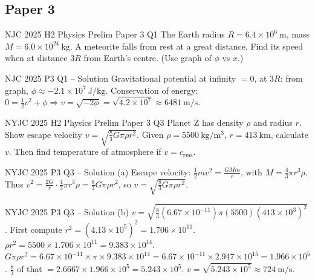 \documentclass[11pt]{beamer}
\begin{document}
\subsection{Paper 3}

\begin{frame}[shrink=15]{NJC 2025 H2 Physics Prelim Paper 3 Q1}
The Earth radius $R = 6.4\times10^6\ \mathrm{m}$, mass $M = 6.0\times10^{24}\ \mathrm{kg}$. A meteorite falls from rest at a great distance. Find its speed when at distance $3R$ from Earth's centre. (Use graph of $\phi$ vs $x$.)
\end{frame}

\begin{frame}{NJC 2025 P3 Q1 – Solution}
Gravitational potential at infinity $=0$, at $3R$: from graph, $\phi \approx -2.1\times10^7\ \mathrm{J/kg}$.
Conservation of energy: $0 = \frac12 v^2 + \phi \Rightarrow v = \sqrt{-2\phi} = \sqrt{4.2\times10^7} \approx 6481\ \mathrm{m/s}$.
\end{frame}

\begin{frame}[shrink=15]{NYJC 2025 H2 Physics Prelim Paper 3 Q3}
Planet Z has density $\rho$ and radius $r$. Show escape velocity $v = \sqrt{\frac83 G\pi\rho r^2}$. Given $\rho = 5500\ \mathrm{kg/m^3}$, $r = 413\ \mathrm{km}$, calculate $v$. Then find temperature of atmosphere if $v = c_{\text{rms}}$.
\end{frame}

\begin{frame}{NYJC 2025 P3 Q3 – Solution (a)}
Escape velocity: $\frac12 m v^2 = \frac{GMm}{r}$, with $M = \frac43 \pi r^3 \rho$.
Thus $v^2 = \frac{2G}{r} \cdot \frac43 \pi r^3 \rho = \frac83 G\pi \rho r^2$, so $v = \sqrt{\frac83 G\pi \rho r^2}$.
\end{frame}

\begin{frame}{NYJC 2025 P3 Q3 – Solution (b)}
$v = \sqrt{\frac83 (6.67\times10^{-11})\pi (5500)(413\times10^3)^2}$.
First compute $r^2 = (4.13\times10^5)^2 = 1.706\times10^{11}$.
$\rho r^2 = 5500\times1.706\times10^{11} = 9.383\times10^{14}$.
$G\pi \rho r^2 = 6.67\times10^{-11}\times\pi\times9.383\times10^{14} = 6.67\times10^{-11}\times2.947\times10^{15} = 1.966\times10^5$.
$\frac83$ of that $= 2.6667\times1.966\times10^5 = 5.243\times10^5$.
$v = \sqrt{5.243\times10^5} \approx 724\ \mathrm{m/s}$.
\end{frame}
\end{document}
